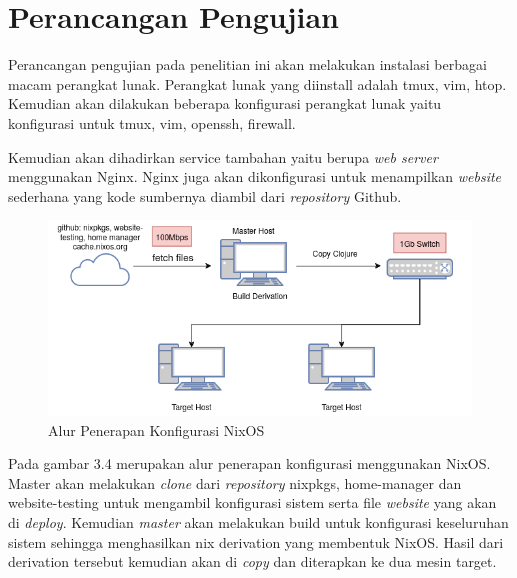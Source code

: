 \documentclass[10pt,twoside]{report}
\begin{document}
\section{Perancangan Pengujian}
\begin{adjustwidth}{20pt}{}
	\hspace\parindent
	Perancangan pengujian pada penelitian ini akan melakukan instalasi berbagai
	macam perangkat lunak. Perangkat lunak yang diinstall adalah tmux, vim,
	htop. Kemudian akan dilakukan beberapa konfigurasi perangkat lunak
	yaitu konfigurasi untuk tmux, vim, openssh, firewall.

	Kemudian akan dihadirkan service tambahan yaitu berupa \textit{web server}
	menggunakan Nginx. Nginx juga akan dikonfigurasi untuk menampilkan
	\textit{website} sederhana yang kode sumbernya diambil dari
	\textit{repository} Github.
	\begin{figure}[H]
		\centering
		\includegraphics[width=\textwidth]{images/nixos-topology-revision.png}
		\caption{Alur Penerapan Konfigurasi NixOS}
	\end{figure}

	Pada gambar 3.4 merupakan alur penerapan konfigurasi menggunakan NixOS.
	Master akan melakukan \textit{clone} dari \textit{repository} nixpkgs,
	home-manager dan website-testing untuk mengambil konfigurasi sistem serta
	file \textit{website} yang akan di \textit{deploy}. Kemudian \textit{master}
	akan melakukan build untuk konfigurasi keseluruhan sistem sehingga
	menghasilkan nix derivation yang membentuk NixOS. Hasil dari derivation
	tersebut kemudian akan di \textit{copy} dan diterapkan ke dua mesin target.


\end{adjustwidth}
\end{document}
